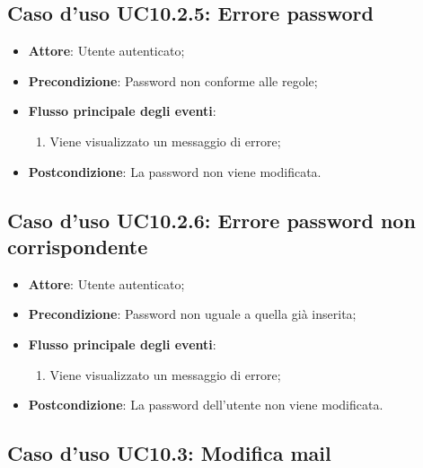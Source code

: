 \documentclass[12pt,a4paper]{article}
\begin{document}
\subsection{Caso d'uso UC10.2.5: Errore password}

\begin{itemize}

\item \textbf{Attore}: Utente autenticato; 
\item \textbf{Precondizione}: Password non conforme alle regole;

\item \textbf{Flusso principale degli eventi}:
\begin{enumerate}
	\item Viene visualizzato un messaggio di errore;
	
\end{enumerate}
\item \textbf{Postcondizione}: La password non viene modificata.
\end{itemize}
\hypertarget{UC10.2.6}{}
\subsection{Caso d'uso UC10.2.6: Errore password non corrispondente}

\begin{itemize}

\item \textbf{Attore}: Utente autenticato; 
\item \textbf{Precondizione}: Password non uguale a quella già inserita;

\item \textbf{Flusso principale degli eventi}:
\begin{enumerate}
	\item Viene visualizzato un messaggio di errore;
	
\end{enumerate}
\item \textbf{Postcondizione}: La password dell'utente non viene modificata.
\end{itemize}
\hypertarget{UC10.3}{}
\subsection{Caso d'uso UC10.3: Modifica mail}
\end{document}
